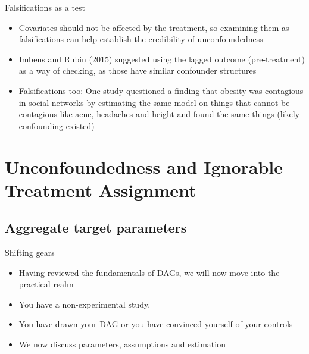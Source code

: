 \documentclass{beamer}
\begin{document}
\begin{frame}{Falsifications as a test}

\begin{itemize}
\item Covariates should not be affected by the treatment, so examining them as falsifications can help establish the credibility of unconfoundedness
\item Imbens and Rubin (2015) suggested using the lagged outcome (pre-treatment) as a way of checking, as those have similar confounder structures
\item Falsifications too: One study questioned a finding that obesity was contagious in social networks by estimating the same model on things that cannot be contagious like acne, headaches and height and found the same things (likely confounding existed)
\end{itemize}

\end{frame}






\section{Unconfoundedness and Ignorable Treatment Assignment}


\subsection{Aggregate target parameters}

\begin{frame}{Shifting gears}

\begin{itemize}
\item Having reviewed the fundamentals of DAGs, we will now move into the practical realm
\item You have a non-experimental study.  
\item You have drawn your DAG or you have convinced yourself of your controls
\item We now discuss parameters, assumptions and estimation
\end{itemize}

\end{frame}
\end{document}
